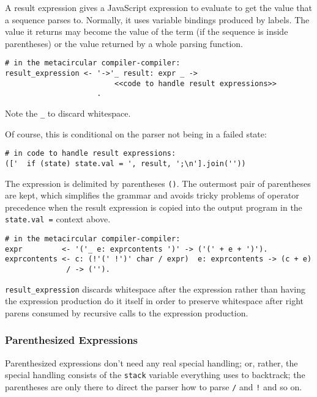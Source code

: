 \documentclass[
]{article}
\begin{document}
A result expression gives a JavaScript expression to evaluate to get the
value that a sequence parses to. Normally, it uses variable bindings
produced by labels. The value it returns may become the value of the
term (if the sequence is inside parentheses) or the value returned by a
whole parsing function.

\begin{verbatim}
# in the metacircular compiler-compiler:
result_expression <- '->'_ result: expr _ ->
                         <<code to handle result expressions>>
                     .
\end{verbatim}

Note the \texttt{\_} to discard whitespace.

Of course, this is conditional on the parser not being in a failed
state:

\begin{verbatim}
# in code to handle result expressions:                         
(['  if (state) state.val = ', result, ';\n'].join(''))
\end{verbatim}

The expression is delimited by parentheses \texttt{()}. The outermost
pair of parentheses are kept, which simplifies the grammar and avoids
tricky problems of operator precedence when the result expression is
copied into the output program in the \texttt{state.val\ =} context
above.

\begin{verbatim}
# in the metacircular compiler-compiler:
expr         <- '('_ e: exprcontents ')' -> ('(' + e + ')').
exprcontents <- c: (!'(' !')' char / expr)  e: exprcontents -> (c + e)
              / -> ('').
\end{verbatim}

\texttt{result\_expression} discards whitespace after the expression
rather than having the expression production do it itself in order to
preserve whitespace after right parens consumed by recursive calls to
the expression production.

\hypertarget{parenthesized-expressions}{%
\subsubsection{Parenthesized
Expressions}\label{parenthesized-expressions}}

Parenthesized expressions don't need any real special handling; or,
rather, the special handling consists of the \texttt{stack} variable
everything uses to backtrack; the parentheses are only there to direct
the parser how to parse \texttt{/} and \texttt{!} and so on.
\end{document}
